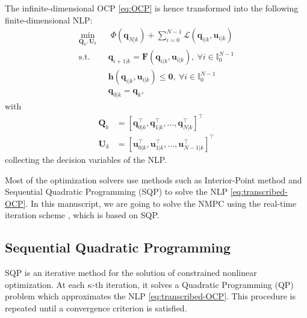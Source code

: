 The infinite-dimensional OCP \eqref{eq:OCP} is hence transformed into the 
following finite-dimensional NLP:
\begin{equation}
    \label{eq:transcribed-OCP}
    \begin{aligned}
        \min_{\bm{Q}_k, \bm{U}_k} \;\;
            & \; \Phi(\bm{q}_{N|k}) + \sum_{i=0}^{N-1} \mathcal{L}(\bm{q}_{i|k}, \bm{u}_{i|k}) \\
            \text{s.t. } & \bm{q}_{i+1|k} = \bm{F}(\bm{q}_{i|k}, \bm{u}_{i|k}), \ \forall i \in \mathbb{I}_{0}^{N-1} \\
                         & \bm{h}(\bm{q}_{i|k}, \bm{u}_{i|k}) \le \bm{0}, \ \forall i \in \mathbb{I}_{0}^{N-1} \\
                         & \bm{q}_{0|k} = \bm{q}_k,
    \end{aligned}
\end{equation}
with
\begin{align*}
\bm{Q}_k &= \left[\bm{q}_{0|k}^\top, \bm{q}_{1|k}^\top, \dots, \bm{q}_{N|k}^\top\right]^\top \\
\bm{U}_k &= \left[\bm{u}_{0|k}^\top, \bm{u}_{1|k}^\top, \dots, \bm{u}_{N-1|k}^\top\right]^\top
\end{align*}
collecting the decision variables of the NLP.

Most of the optimization solvers use methods such as Interior-Point method and 
Sequential Quadratic Programming (SQP) \cite{Nocedal2006NumericalOptimization}
to solve the NLP \eqref{eq:transcribed-OCP}. In this manuscript, we are 
going to solve the NMPC using the real-time iteration scheme
\cite{Gros2020Fromlineartononlinear}, which is based on SQP.

\subsection{Sequential Quadratic Programming}
SQP is an iterative method for the solution of constrained nonlinear 
optimization. At each $\kappa$-th iteration, it solves a Quadratic Programming (QP)
problem which approximates the NLP \eqref{eq:transcribed-OCP}.
This procedure is repeated until a convergence criterion is satisfied.

